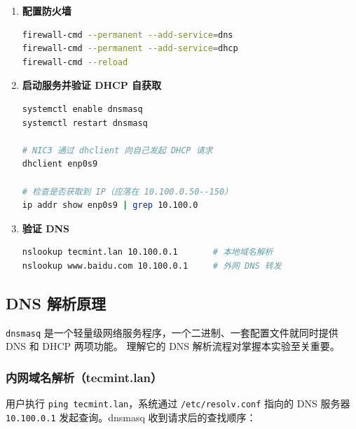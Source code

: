 \documentclass[12pt,a4paper]{ctexart}
\begin{document}
\begin{enumerate}[label=\arabic*.,leftmargin=*]
  \item \textbf{配置防火墙}

  \begin{cmdbox}
  \begin{lstlisting}[language=bash]
firewall-cmd --permanent --add-service=dns
firewall-cmd --permanent --add-service=dhcp
firewall-cmd --reload
  \end{lstlisting}
  \end{cmdbox}

  \item \textbf{启动服务并验证 DHCP 自获取}

  \begin{cmdbox}
  \begin{lstlisting}[language=bash]
systemctl enable dnsmasq
systemctl restart dnsmasq

# NIC3 通过 dhclient 向自己发起 DHCP 请求
dhclient enp0s9

# 检查是否获取到 IP（应落在 10.100.0.50--150）
ip addr show enp0s9 | grep 10.100.0
  \end{lstlisting}
  \end{cmdbox}

  \item \textbf{验证 DNS}

  \begin{cmdbox}
  \begin{lstlisting}[language=bash]
nslookup tecmint.lan 10.100.0.1       # 本地域名解析
nslookup www.baidu.com 10.100.0.1     # 外网 DNS 转发
  \end{lstlisting}
  \end{cmdbox}

\end{enumerate}

\subsection{DNS 解析原理}

\texttt{dnsmasq} 是一个轻量级网络服务程序，一个二进制、一套配置文件就同时提供 DNS 和 DHCP 两项功能。
理解它的 DNS 解析流程对掌握本实验至关重要。

\subsubsection{内网域名解析（tecmint.lan）}

用户执行 \texttt{ping tecmint.lan}，系统通过 \texttt{/etc/resolv.conf} 指向的 DNS 服务器 \texttt{10.100.0.1}
发起查询。dnsmasq 收到请求后的查找顺序：
\end{document}
